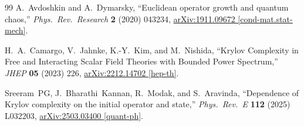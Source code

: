 \documentclass[12pt,a4paper]{article}
\begin{document}
\begin{thebibliography}{99}
A.~Avdoshkin and A.~Dymarsky,
``Euclidean operator growth and quantum chaos,''
\textit{Phys.\ Rev.\ Research} \textbf{2} (2020) 043234,
\href{https://arxiv.org/abs/1911.09672}{arXiv:1911.09672 [cond-mat.stat-mech]}.

H.~A.~Camargo, V.~Jahnke, K.-Y.~Kim, and M.~Nishida,
``Krylov Complexity in Free and Interacting Scalar Field Theories
with Bounded Power Spectrum,''
\textit{JHEP} \textbf{05} (2023) 226,
\href{https://arxiv.org/abs/2212.14702}{arXiv:2212.14702 [hep-th]}.

Sreeram~PG, J.~Bharathi~Kannan, R.~Modak, and S.~Aravinda,
``Dependence of Krylov complexity on the initial operator and state,''
\textit{Phys.\ Rev.\ E} \textbf{112} (2025) L032203,
\href{https://arxiv.org/abs/2503.03400}{arXiv:2503.03400 [quant-ph]}.

\end{thebibliography}
\end{document}

